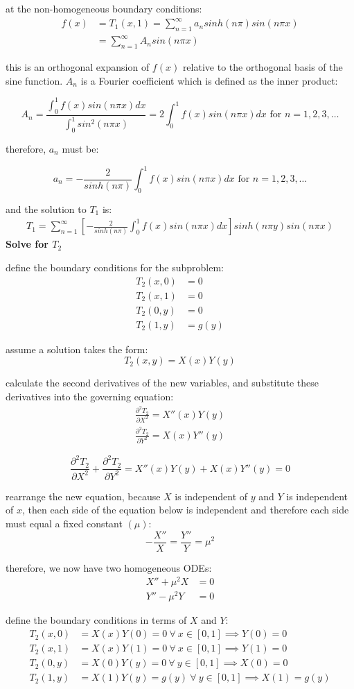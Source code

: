 \documentclass[letterpaper, 10pt, oneside]{article}
\newenvironment{dd}[1]{
	\noindent
	\textbf{\normalsize{#1}}
	\hspace{0.1in}
	\small
	\rmfamily
	}
	{\medskip}
\newcommand{\bes}{\begin{equation*}}
\newcommand{\ees}{\end{equation*}}
\newcommand{\as}[1]{\begin{align*}#1\end{align*}}
\newcommand{\an}[1]{\begin{align}#1\end{align}}
\newcommand{\bdd}{\begin{dd}}
\newcommand{\edd}{\end{dd}}
\begin{document}
	 at the non-homogeneous boundary conditions:
	 \as{f(x) &= T_1(x,1) = \sum_{n=1}^\infty a_n sinh\left( n\pi \right) sin\left( n\pi x \right)\\
	 &=\sum_{n=1}^\infty A_n sin\left( n\pi x \right)}

	 this is an orthogonal expansion of $f(x)$ relative to the orthogonal basis of the sine function. $A_n$ is a Fourier coefficient which is defined as the inner product:

	 $$A_n = \frac{\int_0^1 f(x) sin
	 (n \pi x) dx }{\int_0^1 sin^2(n\pi x)} = 2 \int_0^1 f(x)sin(n\pi x) dx \text{ for } n = 1,2,3, \ldots$$

	 therefore, $a_n$ must be:

	 $$a_n = -\frac{2}{sinh(n\pi)}\int_0^1 f(x)sin(n \pi x) dx \text{ for } n = 1,2,3, \ldots$$

	 and the solution to $T_1$ is:
	 \an{T_1 = \sum_{n=1}^\infty \left[-\frac{2}{sinh(n\pi)}\int_0^1 f(x)sin(n \pi x) dx \right]sinh\left( n\pi y \right) sin\left( n\pi x \right)}
\edd
\bdd{Solve for $T_2$}

	define the boundary conditions for the subproblem:
	\as{T_2(x, 0) & = 0\\
		T_2(x, 1) & = 0 \\
		T_2(0, y) & = 0 \\
		T_2(1, y) & = g(y)}

	assume a solution takes the form: $$T_2(x,y)=X(x)Y(y)$$

	calculate the second derivatives of the new variables, and substitute these derivatives into the governing equation: 
	\as{\frac{\partial^2T_2}{\partial X^2} = X''(x)Y(y) \\
	\frac{\partial^2T_2}{\partial Y^2} = X(x)Y''(y)}

	\bes
	\frac{\partial^2T_2}{\partial X^2} + \frac{\partial^2T_2}{\partial Y^2}= X''(x)Y(y) + X(x)Y''(y) =0
	\ees

	rearrange the new equation, because $X$ is independent of $y$ and $Y$ is independent of $x$, then each side of the equation below is independent and therefore each side must equal a fixed constant $(\mu)$:
	\bes -\frac{X''}{X} = \frac{Y''}{Y} = \mu^2 \ees

	therefore, we now have two homogeneous ODEs: 
	\an{X'' + \mu^2 X &= 0 \label{ode3} \\ Y''-\mu^2 Y &= 0 \label{ode4}}

	define the boundary conditions in terms of $X$ and $Y$:
	\as{T_2(x, 0) & = X(x)Y(0) = 0 \ \forall \ x \in [0,1] \implies Y(0) = 0\\
		T_2(x, 1) & = X(x)Y(1) = 0 \ \forall \ x \in [0,1] \implies Y(1) = 0 \\
		T_2(0, y) & = X(0)Y(y) = 0 \ \forall \ y \in [0,1] \implies X(0) = 0 \\
		T_2(1, y) & = X(1)Y(y) = g(y) \ \forall \ y \in [0,1] \implies X(1) = g(y)}
\end{document}
